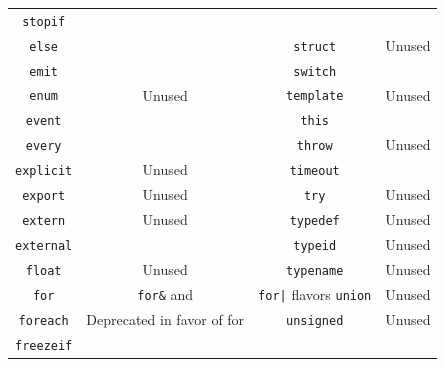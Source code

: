 \documentclass[openright,twoside,12pt]{report}
\begin{document}
\begin{table}[htp]
\begin{tabular}{|c|c||c|c|}
    \lstinline"stopif"            &                                         \\
    \lstinline"else"              &                                         &
    \lstinline"struct"            & Unused                                  \\
    \lstinline"emit"              &                                         &
    \lstinline"switch"            &                                         \\
    \lstinline"enum"              & Unused                                  &
    \lstinline"template"          & Unused                                  \\
    \lstinline"event"             &                                         &
    \lstinline"this"              &                                         \\
    \lstinline"every"             &                                         &
    \lstinline"throw"             & Unused                                  \\
    \lstinline"explicit"          & Unused                                  &
    \lstinline"timeout"           &                                         \\
    \lstinline"export"            & Unused                                  &
    \lstinline"try"               & Unused                                  \\
    \lstinline"extern"            & Unused                                  &
    \lstinline"typedef"           & Unused                                  \\
    \lstinline"external"          &                                         &
    \lstinline"typeid"            & Unused                                  \\
    \lstinline"float"             & Unused                                  &
    \lstinline"typename"          & Unused                                  \\
    \lstinline"for"               & \lstinline|for&| and                    &
                                    \lstinline-for|- flavors
    \lstinline"union"             & Unused                                  \\
    \lstinline"foreach"           & Deprecated in favor of for              &
    \lstinline"unsigned"          & Unused                                  \\
    \lstinline"freezeif"          &                                         &

\end{tabular}
\end{table}
\end{document}

